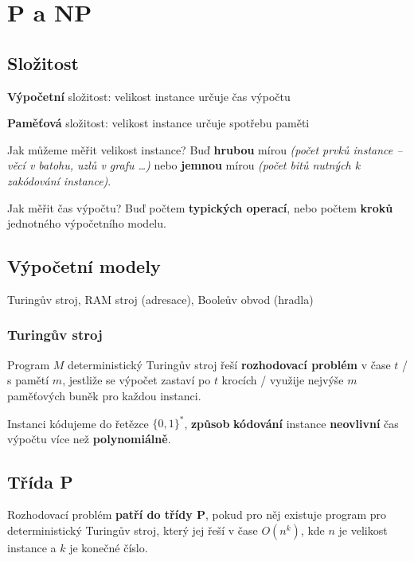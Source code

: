 \section{P a NP}

\subsection{Složitost}

\textbf{Výpočetní} složitost: velikost instance určuje čas výpočtu

\noindent \textbf{Paměťová} složitost: velikost instance určuje spotřebu paměti

\vspace{4pt}
\noindent Jak můžeme měřit velikost instance? Buď \textbf{hrubou} mírou \textit{(počet prvků instance -- věcí v batohu, uzlů v grafu \ldots)} nebo \textbf{jemnou} mírou \textit{(počet bitů nutných k zakódování instance)}.

\vspace{4pt}
\noindent Jak měřit čas výpočtu? Buď počtem \textbf{typických operací}, nebo počtem \textbf{kroků} jednotného výpočetního modelu.

\subsection{Výpočetní modely}

Turingův stroj, RAM stroj (adresace), Booleův obvod (hradla)

\subsubsection*{Turingův stroj}

Program $M$ deterministický Turingův stroj řeší \textbf{rozhodovací problém} v čase $t$ / s pamětí $m$, jestliže se výpočet zastaví po $t$ krocích / využije nejvýše $m$ paměťových buněk pro každou instanci.

\vspace{4pt}
\noindent Instanci kódujeme do řetězce $\{0, 1\}^*$, \textbf{způsob} \textbf{kódování} instance \textbf{neovlivní} čas výpočtu více než \textbf{polynomiálně}.

\subsection{Třída P}

Rozhodovací problém \textbf{patří do třídy P}, pokud pro něj existuje program pro deterministický Turingův stroj, který jej řeší v čase $O(n^k)$, kde $n$ je velikost instance a $k$ je konečné číslo.

